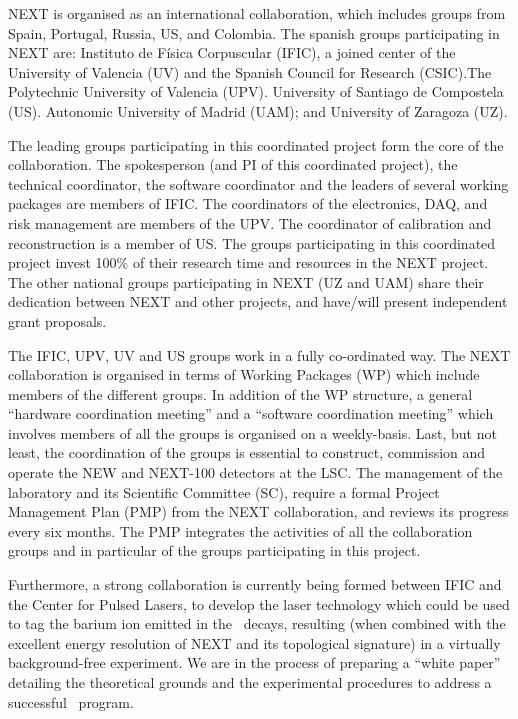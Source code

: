NEXT is organised as an international collaboration, which includes groups from Spain, Portugal, Russia, US, and Colombia. The spanish groups participating in NEXT are: Instituto de Física Corpuscular (IFIC), a joined center of the University of Valencia (UV) and the Spanish Council for Research (CSIC).The  Polytechnic University of Valencia (UPV). University of Santiago de Compostela (US). Autonomic University of Madrid (UAM); and University of Zaragoza (UZ). 

The leading groups participating in this coordinated project form the core of the collaboration. The spokesperson (and PI of this coordinated project), the technical coordinator, the software coordinator and the leaders of several working  packages are members of IFIC. The coordinators of the electronics, DAQ, and risk management are members of the UPV. The coordinator of calibration and reconstruction is a member of US. The groups participating in this coordinated project invest 100\% of their research time and resources in the NEXT project. The other national groups participating in NEXT (UZ and UAM) share their dedication between NEXT and other projects, and have/will present independent grant proposals.

The IFIC, UPV, UV and US groups work in a fully co-ordinated way. The NEXT collaboration is organised in terms of Working Packages (WP) which include members of the different groups. In addition of the WP structure, a general ``hardware coordination meeting'' and a ``software coordination meeting'' which involves members of all the groups is organised on a weekly-basis. Last, but not least, the coordination of the groups is essential to construct, commission and operate the NEW and NEXT-100 detectors at the LSC. The management of the laboratory and its Scientific Committee (SC), require a formal Project Management Plan (PMP) from the NEXT collaboration, and reviews its progress every six months. The PMP integrates the activities of all the collaboration groups and in particular of the groups participating in this project. 

Furthermore, a strong collaboration is currently being formed between IFIC and the Center for Pulsed Lasers, to develop the laser technology which could be used to tag the barium ion emitted in the \bb\ decays, resulting (when combined with the excellent energy resolution of NEXT and its topological signature) in a virtually background-free experiment. We are in the process of preparing a ``white paper'' detailing the theoretical grounds and the experimental procedures to address a successful  \BATA\ program. 
